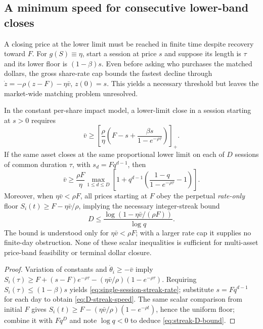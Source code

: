 \documentclass[review,hidelinks,onefignum,onetabnum]{siamonline250211}
\begin{document}
\subsection{A minimum speed for consecutive lower-band closes}\label{subsec:multiday-rate}
A closing price at the lower limit must be reached in finite time despite recovery toward $F$. For $g(S)\equiv\eta$, start a session at price $s$ and suppose its length is $\tau$ and its lower floor is $(1-\beta)s$. Even before asking who purchases the matched dollars, the gross share-rate cap bounds the fastest decline through $\dot z=-\rho(z-F)-\eta\bar v$, $z(0)=s$. This yields a necessary threshold but leaves the market-wide matching problem unresolved.
\begin{proposition}\label{prop:rolling-rate}
In the constant per-share impact model, a lower-limit close in a session starting at $s>0$ requires
\begin{equation}\label{eq:single-session-streak-rate}
 \boxed{\quad\bar v\ge \left[\frac{\rho}{\eta}\left(F-s+
 \frac{\beta s}{1-e^{-\rho\tau}}\right)\right]_+.\quad}
\end{equation}
If the same asset closes at the same proportional lower limit on each of $D$ sessions of common duration $\tau$, with $s_d=Fq^{d-1}$, then
\begin{equation}\label{eq:D-streak-speed}
\boxed{\quad\bar v\ge\frac{\rho F}{\eta}\max_{1\le d\le D}
 \left[1+q^{d-1}\left(\frac{1-q}{1-e^{-\rho\tau}}-1\right)\right].\quad}
\end{equation}
Moreover, when $\eta\bar v<\rho F$, all prices starting at $F$ obey the perpetual \emph{rate-only} floor $S_i(t)\ge F-\eta\bar v/\rho$, implying the necessary integer-streak bound
\begin{equation}\label{eq:streak-D-bound}
\boxed{\quad D\le\frac{\log(1-\eta\bar v/(\rho F))}{\log q}.\quad}
\end{equation}
The bound is understood only for $\eta\bar v<\rho F$; with a larger rate cap it supplies no finite-day obstruction. None of these scalar inequalities is sufficient for multi-asset price-band feasibility or terminal dollar closure.
\end{proposition}
\begin{proof}
Variation of constants and $\dot\theta_i\ge-\bar v$ imply
$S_i(\tau)\ge F+(s-F)e^{-\rho\tau}-(\eta\bar v/\rho)(1-e^{-\rho\tau})$.
Requiring $S_i(\tau)\le(1-\beta)s$ yields \eqref{eq:single-session-streak-rate}; substitute $s=Fq^{d-1}$ for each day to obtain \eqref{eq:D-streak-speed}. The same scalar comparison from initial $F$ gives $S_i(t)\ge F-(\eta\bar v/\rho)(1-e^{-\rho t})$, hence the uniform floor; combine it with $Fq^D$ and note $\log q<0$ to deduce \eqref{eq:streak-D-bound}.
\end{proof}
\end{document}
